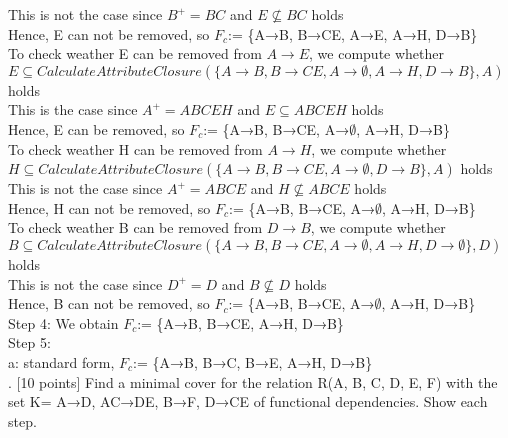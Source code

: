 \documentclass[]{article}
\begin{document}
	This is not the case since $B^{+} = BC$ and $E\not\subseteq BC$ holds  \\
	
	Hence, E can not be removed, so $F_{c}$:= \{A→B, B→CE, A→E, A→H, D→B\} \\
	
	To check weather E can be removed from $A\rightarrow E$, we compute whether $E\subseteq CalculateAttributeClosure(\{A\rightarrow B, B\rightarrow CE, A\rightarrow \emptyset, A\rightarrow H, D\rightarrow B\}, A)$ holds \\
	
	This is the case since $A^{+} = ABCEH$ and $E\subseteq ABCEH$ holds  \\
	
	Hence, E can be removed, so $F_{c}$:= \{A→B, B→CE, A→$\emptyset$, A→H, D→B\} \\
	
	To check weather H can be removed from $A\rightarrow H$, we compute whether $H\subseteq CalculateAttributeClosure(\{A\rightarrow B, B\rightarrow CE, A\rightarrow \emptyset, D\rightarrow B\}, A)$ holds \\
	
	This is not the case since $A^{+} = ABCE$ and $H\not\subseteq ABCE$ holds  \\
	
	Hence, H can not be removed, so $F_{c}$:= \{A→B, B→CE, A→$\emptyset$, A→H, D→B\} \\
	
	To check weather B can be removed from $D\rightarrow B$, we compute whether $B\subseteq CalculateAttributeClosure(\{A\rightarrow B, B\rightarrow CE, A\rightarrow \emptyset, A\rightarrow H, D\rightarrow \emptyset\}, D)$ holds \\
	
	This is not the case since $D^{+} = D$ and $B\not\subseteq D$ holds  \\
	
	Hence, B can not be removed, so $F_{c}$:= \{A→B, B→CE, A→$\emptyset$, A→H, D→B\} \\
	
	\noindent Step 4: We obtain $F_{c}$:= \{A→B, B→CE, A→H, D→B\} \\
	
	\noindent Step 5:  \\
	
	a: standard form, $F_{c}$:= \{A→B, B→C, B→E, A→H, D→B\}  \\
	
	. [10 points] Find a minimal cover for the relation R(A, B, C, D, E, F) with the set K= {A→D, AC→DE, B→F, D→CE} of functional dependencies. Show each step.    \\
	
\end{document}
